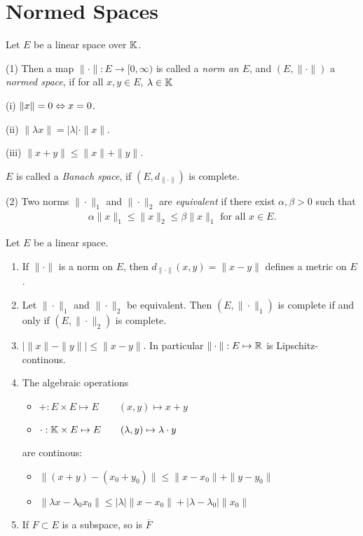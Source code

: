 \section{Normed Spaces}

\begin{definition} Let $E$ be a linear space over $\mathbb{K}$.
	\begin{description}
	\item{(1)} Then a map $\|\cdot\|\colon E\to[0,\infty)$ is called a \emph{norm an $E$}, and $(E,\|\cdot\|)$ a \emph{normed space}, 
		if for all $x,y\in E$, $\lambda\in\mathbb{K}$
		\begin{description}
		\item{(i)} $\|x\|=0\Leftrightarrow x=0$.
		\item{(ii)} $\|\lambda x\|=|\lambda|\cdot\|x\|.$
		\item{(iii)} $\|x+y\|\leq\|x\|+\|y\|.$
		\end{description}
		$E$ is called a \emph{Banach space}, if $(E,d_{\|\cdot\|})$ is complete.
	\item{(2)} Two norms $\|\cdot\|_1$ and $\|\cdot\|_2$ are \emph{equivalent} if there exist $\alpha,\beta >0$ such that
		\begin{align*} \alpha \|x\|_1\leq\|x\|_2\leq\beta\|x\|_1\text{ for all }x\in E.\end{align*}
	\end{description}
\end{definition}

\begin{bem}
	Let $E$ be a linear space.
	\begin{enumerate}[(1)]
		\item If $\| \cdot \|$ is a norm on $E$, then $d_{\|\cdot\|}(x,y) = \|x-y\|$ defines a metric on $E$.
		\item Let $\| \cdot \|_{1}$ and $\| \cdot \|_{2}$ be equivalent. Then $(E,\| \cdot \|_{1})$ is complete
			if and only if $(E,\| \cdot \|_{2})$ is complete.
		\item $ | \|x\| - \|y\| | \le \|x - y\|$. In particular $\| \cdot \|: E \mapsto \mathbb{R}$ is Lipschitz-continous.
		\item The algebraic operations
			\begin{itemize}
				\item $+: E \times E \mapsto E \qquad (x,y) \mapsto x + y$
				\item $\cdot: \mathbb{K} \times E \mapsto E \qquad (\lambda,y) \mapsto \lambda \cdot y$
			\end{itemize}
			are continous:
			\begin{itemize}
				\item $\|(x+y) - (x_0 + y_0)\| \le \| x-x_0 \| + \|y-y_0\|$
				\item $\| \lambda x - \lambda_0 x_0 \| \le |\lambda| \|x - x_0\| + |\lambda - \lambda_0| \|x_0\| $
			\end{itemize}
		\item If $F \subset E$ is a subspace, so is $\overline F$
	\end{enumerate}
\end{bem}


